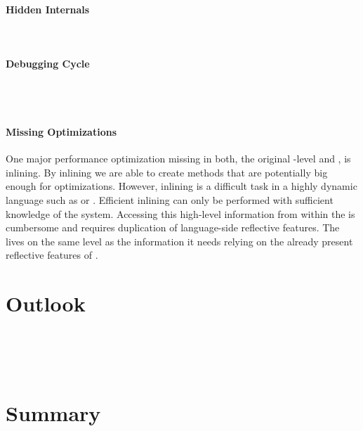 \paragraph{Hidden \VM Internals}
\\


\paragraph{Debugging Cycle}
 \\
 \\

\paragraph{Missing Optimizations}
One major performance optimization missing in both, the original \PH \VM-level \JIT and \NBJ, is inlining. 
By inlining we are able to create methods that are potentially big enough for optimizations.
However, inlining is a difficult task in a highly dynamic language such as \ST or \Self \cite{Cham89a}. 
Efficient inlining can only be performed with sufficient knowledge of the system. 
Accessing this high-level information from within the \VM is cumbersome and requires duplication of language-side reflective features.
The \JIT lives on the same level as the information it needs relying on the already present reflective features of \ST.


\section{Outlook}

 \\
 \\
 \\


\section{Summary}


